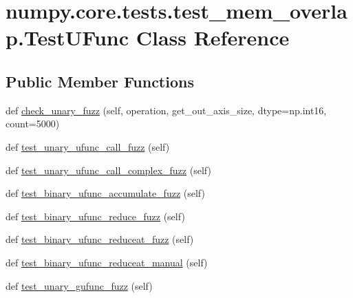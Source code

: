 \hypertarget{classnumpy_1_1core_1_1tests_1_1test__mem__overlap_1_1TestUFunc}{}\section{numpy.\+core.\+tests.\+test\+\_\+mem\+\_\+overlap.\+Test\+U\+Func Class Reference}
\label{classnumpy_1_1core_1_1tests_1_1test__mem__overlap_1_1TestUFunc}
\subsection*{Public Member Functions}
\begin{DoxyCompactItemize}
\item 
def \hyperlink{classnumpy_1_1core_1_1tests_1_1test__mem__overlap_1_1TestUFunc_adfd9961c77a338fc60c68c382f74d4eb}{check\+\_\+unary\+\_\+fuzz} (self, operation, get\+\_\+out\+\_\+axis\+\_\+size, dtype=np.\+int16, count=5000)
\item 
def \hyperlink{classnumpy_1_1core_1_1tests_1_1test__mem__overlap_1_1TestUFunc_a1456feed6ceb99090de56d52b9113392}{test\+\_\+unary\+\_\+ufunc\+\_\+call\+\_\+fuzz} (self)
\item 
def \hyperlink{classnumpy_1_1core_1_1tests_1_1test__mem__overlap_1_1TestUFunc_a877e35426430b0c75872626a7f39de53}{test\+\_\+unary\+\_\+ufunc\+\_\+call\+\_\+complex\+\_\+fuzz} (self)
\item 
def \hyperlink{classnumpy_1_1core_1_1tests_1_1test__mem__overlap_1_1TestUFunc_a353ac41b5e0c7e713a51a151f2357924}{test\+\_\+binary\+\_\+ufunc\+\_\+accumulate\+\_\+fuzz} (self)
\item 
def \hyperlink{classnumpy_1_1core_1_1tests_1_1test__mem__overlap_1_1TestUFunc_aa6724e068486158784f3b8d63da93f88}{test\+\_\+binary\+\_\+ufunc\+\_\+reduce\+\_\+fuzz} (self)
\item 
def \hyperlink{classnumpy_1_1core_1_1tests_1_1test__mem__overlap_1_1TestUFunc_a4bad99431ae43473e15346678eeae679}{test\+\_\+binary\+\_\+ufunc\+\_\+reduceat\+\_\+fuzz} (self)
\item 
def \hyperlink{classnumpy_1_1core_1_1tests_1_1test__mem__overlap_1_1TestUFunc_a5cd1c580e4c52aa8c62b75ba1ce545a8}{test\+\_\+binary\+\_\+ufunc\+\_\+reduceat\+\_\+manual} (self)
\item 
def \hyperlink{classnumpy_1_1core_1_1tests_1_1test__mem__overlap_1_1TestUFunc_ae74a8ee43f98e41d6d019e390c67e1d0}{test\+\_\+unary\+\_\+gufunc\+\_\+fuzz} (self)

\end{DoxyCompactItemize}
